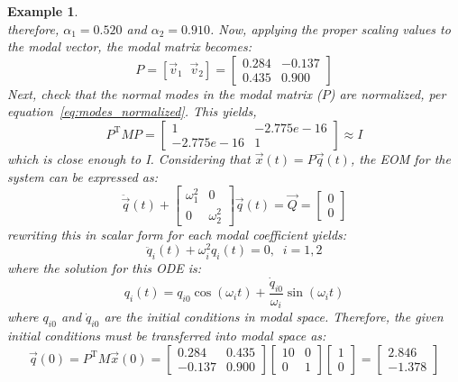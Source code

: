 \documentclass[12pt,letter]{article}
\newtheorem{ex}{Example}
\numberwithin{ex}{section} %
\newenvironment{example}{\begin{mdframed}[middlelinewidth=0.5mm]\begin{ex}\normalfont}{\end{ex}\end{mdframed}}
\numberwithin{re}{section} %
\begin{document}
\begin{example}
\begin{equation}
\end{equation}
therefore, $\alpha_1=0.520$ and $\alpha_2=0.910$. Now, applying the proper scaling values to the modal vector, the modal matrix becomes:
\begin{equation}
P = [ \vec{v}_1 \; \; \vec{v}_2 ] = \begin{bmatrix} 0.284 & -0.137 \\    0.435  & 0.900 \end{bmatrix}
\end{equation}
Next, check that the normal modes in the modal matrix ($P$) are normalized, per equation~\ref{eq:modes_normalized}. This yields,
\begin{equation}
P^{\text{T}} M P = \begin{bmatrix} 1 & -2.775e-16 \\   -2.775e-16 & 1 \end{bmatrix} \approx I
\end{equation}
which is close enough to I. Considering that $\vec{x}(t) = P\vec{q}(t)$, the EOM for the system can be expressed as:
\begin{equation}
\ddot{\vec{q}}(t) + \begin{bmatrix} \omega_1^2 & 0 \\    0  & \omega_2^2 \end{bmatrix} \vec{q} (t) = \vec{Q} = \begin{bmatrix} 0 \\  0  \end{bmatrix} 
\end{equation}
rewriting this in scalar form for each modal coefficient yields:
\begin{equation}
\ddot{q}_i(t) + \omega_i^2 q_i (t) = 0, \; \; i=1,2
\end{equation}
where the solution for this ODE is:
\begin{equation}
q_i(t) = q_{i0} \cos(\omega_i t) +  \frac{\dot{q}_{i0}}{\omega_i} \sin( \omega_i t)
\end{equation}
where $q_{i0}$ and $\dot{q}_{i0}$ are the initial conditions in modal space. Therefore, the given initial conditions must be transferred into modal space as:
\begin{equation}
\vec{q}(0) = P^\text{T} M \vec{x}(0) = \begin{bmatrix} 0.284 &  0.435 \\  -0.137    & 0.900 \end{bmatrix} \begin{bmatrix} 10 & 0 \\  0  & 1 \end{bmatrix}  \begin{bmatrix} 1 \\  0 \end{bmatrix} =  \begin{bmatrix}  2.846 \\  -1.378 \end{bmatrix}

\end{equation}
\end{example}
\end{document}
